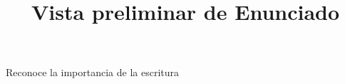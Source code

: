\documentclass[a4paper,12pt]{article}\usepackage[utf8]{inputenc}\usepackage[spanish]{babel}\usepackage{times}
\title{Vista preliminar de Enunciado}
\begin{document}
\twocolumn 

\maketitle

Reconoce la importancia de la escritura
\end{document}
